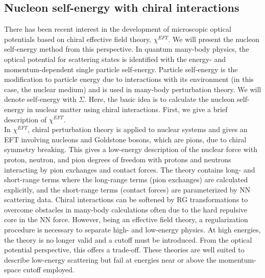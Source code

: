 \documentclass[preprintnumbers,floatfix,aps,prc,preprint,nofootinbib]{revtex4-1}
\begin{document}
	
\subsection{Nucleon self-energy with chiral interactions}
\label{sec:nucleon_self_energy}

There has been recent interest in the development of microscopic optical potentials based on chiral effective field theory, $\chi^{EFT}$. We will present the nucleon self-energy method from this perspective. In quantum many-body physics, the optical potential for scattering states is identified with the energy- and momentum-dependent single particle self-energy. Particle self-energy is the modification to particle energy due to interactions with its environment (in this case, the nuclear medium) and is used in many-body perturbation theory. We will denote self-energy with $\Sigma$. Here, the basic idea is to calculate the nucleon self-energy in nuclear matter using chiral interactions. First, we give a brief description of $\chi^{EFT}$.
\\

In $\chi^{EFT}$, chiral perturbation theory is applied to nuclear systems and gives an EFT involving nucleons and Goldstone bosons, which are pions, due to chiral symmetry breaking. This gives a low-energy description of the nuclear force with proton, neutron, and pion degrees of freedom with protons and neutrons interacting by pion exchanges and contact forces. The theory contains long- and short-range terms where the long-range terms (pion exchanges) are calculated explicitly, and the short-range terms (contact forces) are parameterized by NN scattering data. Chiral interactions can be softened by RG transformations to overcome obstacles in many-body calculations often due to the hard repulsive core in the NN force. However, being an effective field theory, a regularization procedure is necessary to separate high- and low-energy physics. At high energies, the theory is no longer valid and a cutoff must be introduced. From the optical potential perspective, this offers a trade-off. These theories are well suited to describe low-energy scattering but fail at energies near or above the momentum-space cutoff employed.
\\
\end{document}
